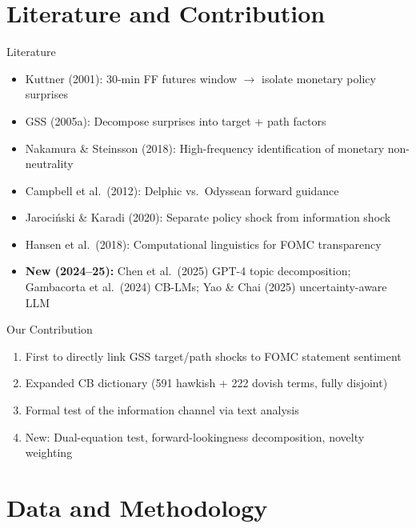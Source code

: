 \documentclass[aspectratio=169, 11pt]{beamer}
\begin{document}
\section{Literature and Contribution}

\begin{frame}{Literature}
  \begin{itemize}
    \item Kuttner (2001): 30-min FF futures window $\to$ isolate monetary policy surprises
    \item GSS (2005a): Decompose surprises into target + path factors
    \item Nakamura \& Steinsson (2018): High-frequency identification of monetary non-neutrality
    \item Campbell et al.\ (2012): Delphic vs.\ Odyssean forward guidance
    \item Jaroci\'{n}ski \& Karadi (2020): Separate policy shock from information shock
    \item Hansen et al.\ (2018): Computational linguistics for FOMC transparency
    \item \textbf{New (2024--25):} Chen et al.\ (2025) GPT-4 topic decomposition; Gambacorta et al.\ (2024) CB-LMs; Yao \& Chai (2025) uncertainty-aware LLM
  \end{itemize}

  \vspace{0.5em}
  \begin{block}{Our Contribution}
    \begin{enumerate}
      \item First to directly link GSS target/path shocks to FOMC statement sentiment
      \item Expanded CB dictionary (591 hawkish + 222 dovish terms, fully disjoint)
      \item Formal test of the information channel via text analysis
      \item New: Dual-equation test, forward-lookingness decomposition, novelty weighting
    \end{enumerate}
  \end{block}
\end{frame}

\section{Data and Methodology}
\end{document}
